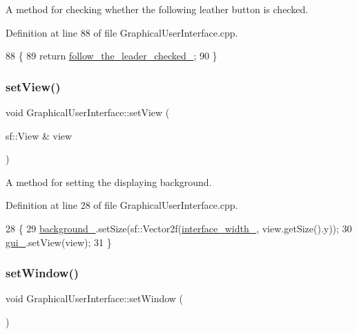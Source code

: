 A method for checking whether the following leather button is checked. 



Definition at line 88 of file Graphical\+User\+Interface.\+cpp.


\begin{DoxyCode}
88                                                               \{
89     \textcolor{keywordflow}{return} \hyperlink{classGraphicalUserInterface_a57fe5ef98f53a222aab96d191e869ad3}{follow\_the\_leader\_checked\_};
90 \}
\end{DoxyCode}
\mbox{\label{classGraphicalUserInterface_ab0c8cd6460442a3ad01c304ec1216631}} 
\subsubsection{\texorpdfstring{set\+View()}{setView()}}
{\footnotesize\ttfamily void Graphical\+User\+Interface\+::set\+View (\begin{DoxyParamCaption}\item[{sf\+::\+View \&}]{view }\end{DoxyParamCaption})}



A method for setting the displaying background. 



Definition at line 28 of file Graphical\+User\+Interface.\+cpp.


\begin{DoxyCode}
28                                                  \{
29     \hyperlink{classGraphicalUserInterface_a6d706ef82ec59d143a009331b40681bb}{background\_}.setSize(sf::Vector2f(\hyperlink{classGraphicalUserInterface_ae3c07ea59e557909f92882028fafb0a3}{interface\_width\_}, view.getSize().y));
30     \hyperlink{classGraphicalUserInterface_ab07abda0fdb8e2965b70d2024fa3cf20}{gui\_}.setView(view);
31 \}
\end{DoxyCode}
\mbox{\label{classGraphicalUserInterface_a9dc5f335b77be5a4d871926155afb8dd}} 
\subsubsection{\texorpdfstring{set\+Window()}{setWindow()}}
{\footnotesize\ttfamily void Graphical\+User\+Interface\+::set\+Window (\begin{DoxyParamCaption}{ }\end{DoxyParamCaption})}



